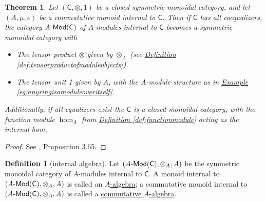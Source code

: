 \documentclass[a4paper]{report}
\newcommand{\defn}[1]{\ul{#1}}
\def\mhyp{{\hbox{-}}}
\theoremstyle{definition}
\newtheorem{definition}{Definition}[section]
\theoremstyle{plain}
\newtheorem{theorem}{Theorem}[section]
\theoremstyle{remark}
\begin{document}
\begin{theorem}
  Let $(\mathsf{C}, \otimes, 1)$ be a closed symmetric monoidal category, and let $(A, \mu, e)$ be a commutative monoid internal to $\mathsf{C}$. Then if $\mathsf{C}$ has all coequalizers, the category $A\mhyp\mathsf{Mod}(\mathsf{C})$ of $A$-modules internal to $\mathsf{C}$ becomes a symmetric monoidal category with
  \begin{itemize}
    \item The tensor product $\otimes$ given by $\otimes_{A}$ (see \hyperref[def:tensorproductofmoduleobjects]{Definition \ref*{def:tensorproductofmoduleobjects}}).

    \item The tensor unit 1 given by $A$, with the $A$-module structure as in \hyperref[eg:anyringisamoduleoveritself]{Example \ref*{eg:anyringisamoduleoveritself}}.
  \end{itemize}

  Additionally, if all equalizers exist the $\mathsf{C}$ is a closed monoidal category, with the function module $\hom_{A}$ from \hyperref[def:functionmodule]{Definition \ref*{def:functionmodule}} acting as the internal hom.
\end{theorem}
\begin{proof}
  See \cite{nlab-deligne-theorem}, Proposition 3.65.
\end{proof}

\begin{definition}[internal algebra]
  \label{def:internalalgebra}
  Let $(A\mhyp\mathsf{Mod}(\mathsf{C}), \otimes_{A}, A)$ be the symmetric monoidal category of $A$-modules internal to $\mathsf{C}$. A monoid internal to $(A\mhyp\mathsf{Mod}(\mathsf{C}), \otimes_{A}, A)$ is called an \defn{$A$-algebra}; a commutative monoid internal to $(A\mhyp\mathsf{Mod}(\mathsf{C}), \otimes_{A}, A)$ is called a \defn{commutative $A$-algebra}.
\end{definition}
\end{document}
